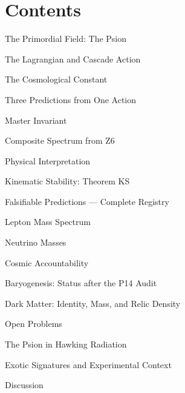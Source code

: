 \documentclass[11pt,letterpaper]{article}
\begin{document}
\clearpage
\section*{Contents}

{\small {}  The Primordial Field: The Psion\par}

{\small {}  The Lagrangian and Cascade Action\par}

{\small {}  The Cosmological Constant\par}

{\small {}  Three Predictions from One Action\par}

{\small {}  Master Invariant\par}

{\small {}  Composite Spectrum from Z6\par}

{\small {}  Physical Interpretation\par}

{\small {}  Kinematic Stability: Theorem KS\par}

{\small {}  Falsifiable Predictions --- Complete Registry\par}

{\small {}  Lepton Mass Spectrum\par}

{\small {}  Neutrino Masses\par}

{\small {}  Cosmic Accountability\par}

{\small {}  Baryogenesis: Status after the P14 Audit\par}

{\small {}  Dark Matter: Identity, Mass, and Relic Density\par}

{\small {}  Open Problems\par}

{\small {}  The Psion in Hawking Radiation\par}

{\small {}  Exotic Signatures and Experimental Context\par}

{\small {}  Discussion\par}
\end{document}
